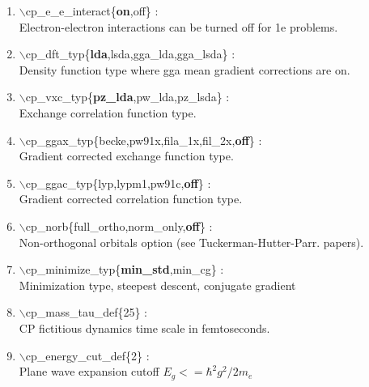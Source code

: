 \documentclass[12pt]{article}
\begin{document}
\begin{enumerate}

 \vspace{0.15in} 
 \item  $\backslash$cp\_e\_e\_interact\{{\bf on},off\} : \\
     Electron-electron interactions can be turned off for 1e problems.

 \vspace{0.15in} 
 \item  $\backslash$cp\_dft\_typ\{{\bf lda},lsda,gga\_lda,gga\_lsda\} : \\
     Density function type where gga mean gradient corrections are on.

 \vspace{0.15in} 
 \item  $\backslash$cp\_vxc\_typ\{{\bf pz\_lda},pw\_lda,pz\_lsda\} : \\
     Exchange correlation function type.

 \vspace{0.15in} 
 \item  $\backslash$cp\_ggax\_typ\{becke,pw91x,fila\_1x,fil\_2x,{\bf off}\} : \\
     Gradient corrected exchange function type.

 \vspace{0.15in} 
 \item  $\backslash$cp\_ggac\_typ\{lyp,lypm1,pw91c,{\bf off}\} : \\
     Gradient corrected correlation function type.

 \vspace{0.15in} 
 \item  $\backslash$cp\_norb\{full\_ortho,norm\_only,{\bf off}\} : \\
     Non-orthogonal orbitals option (see Tuckerman-Hutter-Parr. papers).

 \vspace{0.15in} 
 \item  $\backslash$cp\_minimize\_typ\{{\bf min\_std},min\_cg\} : \\
      Minimization type, steepest descent, conjugate gradient 

 \vspace{0.15in} 
 \item  $\backslash$cp\_mass\_tau\_def\{25\} : \\
      CP fictitious dynamics time scale in femtoseconds.

 \vspace{0.15in} 
 \item  $\backslash$cp\_energy\_cut\_def\{2\} : \\
      Plane wave expansion cutoff $E_g<=\hbar^2g^2/2m_e$ 


\end{enumerate}
\end{document}
